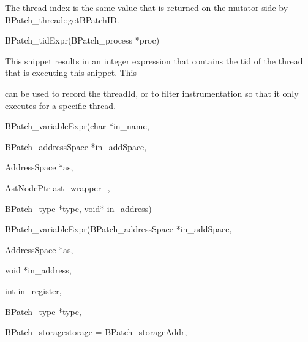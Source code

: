 {{{{{{{The thread index is the same value that is returned on the mutator side by BPatch_thread::getBPatchID.}





\bigskip



{

BPatch_tidExpr(BPatch_process *proc)}



{

This snippet results in an integer expression that contains the tid of the thread that is executing this snippet. This

can be used to record the threadId, or to filter instrumentation so that it only executes for a specific thread.}



{

BPatch_variableExpr(char *in_name,}



{

BPatch_addressSpace *in_addSpace,}



{

AddressSpace *as,}



{

AstNodePtr ast_wrapper_,}



{

BPatch_type *type, void* in_address)}



{

BPatch_variableExpr(BPatch_addressSpace *in_addSpace,}



{

AddressSpace *as,}



{

void *in_address,}



{

int in_register,}



{

BPatch_type *type,}



{

BPatch_storagestorage = BPatch_storageAddr,}



}}}}}}
